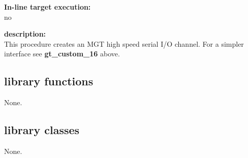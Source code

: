             {\bf In-line target execution:} \\
            no

            {\bf description:} \\
            This procedure creates an MGT high speed serial I/O channel.
            For a simpler interface
            see {\bf gt\_custom\_16}  above.



    \subsection{library functions}
    
        None.


    \subsection{library classes}
    
        None.
